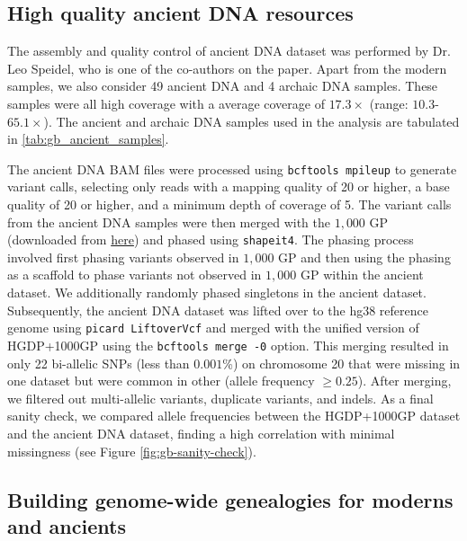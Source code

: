 \subsection{High quality ancient DNA resources}

The assembly and quality control of ancient DNA dataset was performed by Dr. Leo Speidel, who is one of the co-authors on the paper.
%
Apart from the modern samples, we also consider 49 ancient DNA and 4 archaic DNA samples. These samples were all high coverage with a average coverage of $17.3\times$ (range: $10.3$-$65.1 \times$). The ancient and archaic DNA samples used in the analysis are tabulated in \ref{tab:gb_ancient_samples}.

The ancient DNA BAM files were processed using \texttt{bcftools mpileup} to generate variant calls, selecting only reads with a mapping quality of 20 or higher, a base quality of 20 or higher, and a minimum depth of coverage of 5.
%
The variant calls from the ancient DNA samples were then merged with the $1{,}000$ GP (downloaded from \href{https://ftp.1000genomes.ebi.ac.uk/vol1/ftp/release/20130502/}{here}) and phased using \texttt{shapeit4}. The phasing process involved first phasing variants observed in $1{,}000$ GP and then using the phasing as a scaffold to phase variants not observed in $1{,}000$ GP within the ancient dataset. We additionally randomly phased singletons in the ancient dataset. 
%
Subsequently, the ancient DNA dataset was lifted over to the hg38 reference genome using \texttt{picard LiftoverVcf} and merged with the unified version of HGDP+1000GP using the \texttt{bcftools merge -0} option. This merging resulted in only 22 bi-allelic SNPs (less than $0.001$\%) on chromosome 20 that were missing in one dataset but were common in other (allele frequency $\geq 0.25$). After merging, we filtered out multi-allelic variants, duplicate variants, and indels. As a final sanity check, we compared allele frequencies between the HGDP+1000GP dataset and the ancient DNA dataset, finding a high correlation with minimal missingness (see Figure \ref{fig:gb-sanity-check}).

\subsection{Building genome-wide genealogies for moderns and ancients}

